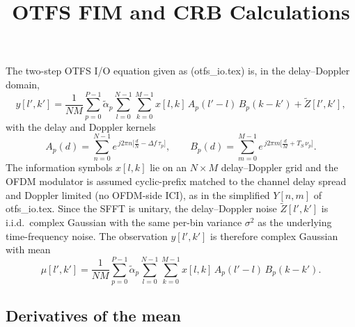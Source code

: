 \documentclass[11pt]{article}
\title{OTFS FIM and CRB Calculations}
\author{}
\date{}
\begin{document}
\maketitle

The two-step OTFS I/O equation given as (otfs\_io.tex) is, in the
delay--Doppler domain,
\begin{equation}
    y[l',k'] = \frac{1}{NM}\sum_{p=0}^{P-1} \tilde{\alpha}_p
               \sum_{l=0}^{N-1}\sum_{k=0}^{M-1} x[l,k]\,
               A_p(l'-l)\, B_p(k-k') + \tilde{Z}[l',k'],
\label{eq:OTFS_IO}
\end{equation}
with the delay and Doppler kernels
\begin{equation}
    A_p(d) = \sum_{n=0}^{N-1} e^{\,j2\pi n\bigl[\tfrac{d}{N} - \Delta f\,\tau_p\bigr]},
    \qquad
    B_p(d) = \sum_{m=0}^{M-1} e^{\,j2\pi m\bigl[\tfrac{d}{M} + T_S\,\nu_p\bigr]}.
\end{equation}
The information symbols \(x[l,k]\) lie on an \(N\times M\) delay--Doppler grid
and the OFDM modulator is assumed cyclic-prefix matched to the channel
delay spread and Doppler limited (no OFDM-side ICI), as in the
simplified \(Y[n,m]\) of otfs\_io.tex. Since the SFFT is unitary, the
delay--Doppler noise \(\tilde{Z}[l',k']\) is i.i.d.\ complex Gaussian with
the same per-bin variance \(\sigma^2\) as the underlying time-frequency
noise. The observation \(y[l',k']\) is therefore complex Gaussian with
mean
\begin{equation}
    \mu[l',k'] = \frac{1}{NM}\sum_{p=0}^{P-1} \tilde{\alpha}_p
                 \sum_{l=0}^{N-1}\sum_{k=0}^{M-1} x[l,k]\,
                 A_p(l'-l)\, B_p(k-k').
\end{equation}

\subsection*{Derivatives of the mean}
\end{document}
